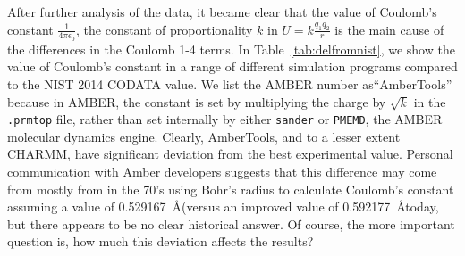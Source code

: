 After further analysis of the data, it became clear that the value of
Coulomb's constant $\frac{1}{4 \pi \epsilon_0}$, the constant of
proportionality $k$ in $U = k\frac{q_1q_2}{r}$ is the main cause of the
differences in the Coulomb 1-4 terms. In Table~\ref{tab:delfromnist},
we show the value of Coulomb's constant in a range of different
simulation programs compared to the NIST 2014 CODATA value.  We list
the AMBER number as``AmberTools''
because in AMBER, the constant is set by multiplying the charge by
$\sqrt{k}$ in the {\tt .prmtop} file, rather than set internally by
either {\tt sander} or {\tt PMEMD}, the AMBER molecular dynamics
engine.  Clearly, AmberTools, and to a lesser extent CHARMM, have
significant deviation from the best experimental value.  Personal
communication with Amber developers suggests that this difference may
come from mostly from in the 70's using Bohr's radius to calculate
Coulomb's constant assuming a value of 0.529167~\AA (versus an
improved value of 0.592177~\AA today, but there appears to be no clear
historical answer.  Of course, the more important question is, how
much this deviation affects the results?

